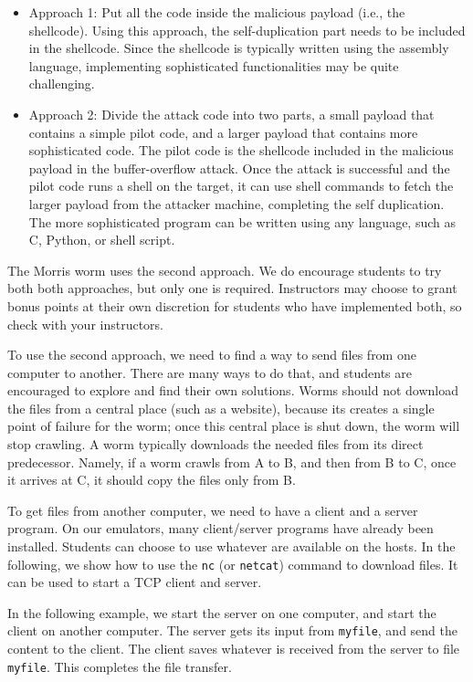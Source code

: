 \begin{itemize}
  \item Approach 1: Put all the code inside the 
    malicious payload (i.e., the shellcode). Using this approach,
    the self-duplication part needs to be included 
    in the shellcode. Since the shellcode is typically written using 
    the assembly language, implementing sophisticated 
    functionalities may be quite challenging.

  \item Approach 2: Divide the attack code into two
    parts, a small payload that contains a simple pilot code, 
    and a larger payload that contains more sophisticated code. 
    The pilot code is the shellcode included in the malicious payload 
    in the buffer-overflow attack. 
    Once the attack is successful and the pilot code runs a shell
    on the target, it can  use shell commands to fetch the larger payload 
    from the attacker machine, completing the self duplication. 
    The more sophisticated program can be written using any language,
    such as C, Python, or shell script. 
\end{itemize}

The Morris worm uses the second approach. We do encourage 
students to try both both approaches, but only one is required. 
Instructors may choose to grant bonus points at their own
discretion for students who have implemented both, 
so check with your instructors.  


To use the second approach, we need to find a way to send
files from one computer to another. There are many ways to do that,
and students are encouraged to explore and find their own solutions.
Worms should not download the files from a central 
place (such as a website), because its creates a single point of failure 
for the worm; once this central place is shut down, the 
worm will stop crawling. A worm typically downloads the needed files from
its direct predecessor. Namely, if a worm crawls from A to B, 
and then from B to C, once it arrives at C, it should
copy the files only from B. 


To get files from another computer, we need to have a client 
and a server program. On our emulators, many client/server programs
have already been installed. Students can choose to use
whatever are available on the hosts. In the following, 
we show how to use the \texttt{nc} (or \texttt{netcat})  
command to download files. 
It can be used to start a TCP client and server. 

In the following example, we start the server on one computer,
and start the client on another computer. The server gets its input
from \texttt{myfile}, and send the content to the client. 
The client saves
whatever is received from the server to file \texttt{myfile}. This completes
the file transfer.

